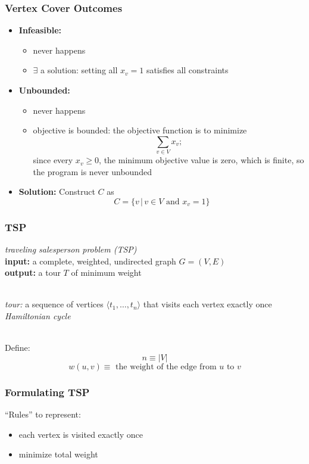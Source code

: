 \documentclass{beamer}
\newcommand{\stanza}{ \\~\ }
\begin{document}
\begin{frame} \frametitle{Vertex Cover Outcomes}
  \begin{itemize}
    \item \textbf{Infeasible:}
      \begin{itemize}
      \item never happens
      \item $\exists$ a solution: setting all $x_v=1$ satisfies all constraints
      \end{itemize}
    \item \textbf{Unbounded:}
    \begin{itemize}
      \item never happens
      \item objective is bounded: the objective function is to minimize 
        \[ \sum_{v \in V} x_v; \]
        since every $x_v \geq 0$, the minimum objective value is zero, which is finite, so the program is never unbounded
    \end{itemize}
    \item \textbf{Solution:} Construct $C$ as
      \[ C = \{ v \,|\, v \in V \text{ and } x_v=1 \} \]
    \end{itemize}
  \end{frame}

  \begin{frame} \frametitle{TSP}
    \emph{traveling salesperson problem (TSP)} \\
    \textbf{input:} a complete, weighted, undirected graph $G=(V, E)$ \\
    \textbf{output:} a tour $T$ of minimum weight
    \stanza

    \emph{tour:} a sequence of vertices $\langle t_1, \ldots, t_n \rangle$
    that visits each vertex exactly once \emph{Hamiltonian cycle}
    \stanza
  
    Define: \\
    \[ n \equiv |V| \]
    \[ w(u, v) \equiv \text{ the weight of the edge from } u \text{ to } v \]
  \end{frame}
  
  \begin{frame} \frametitle{Formulating TSP}
    ``Rules'' to represent:
      \begin{itemize}
        \item each vertex is visited exactly once
        \item minimize total weight
      \end{itemize}
  \end{frame}
  
\end{document}
